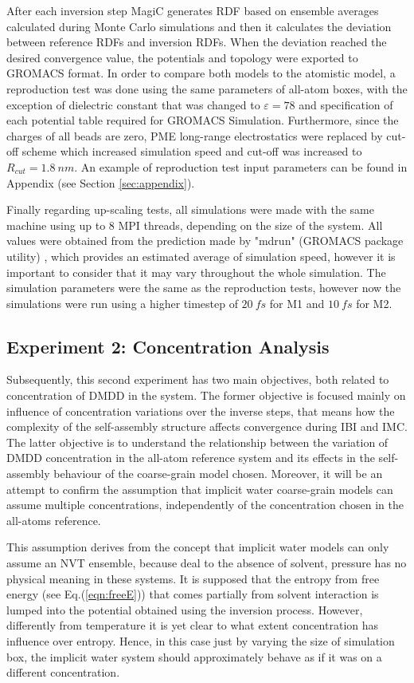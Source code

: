 \documentclass[10pt,a4paper,twoside]{article}
\begin{document}
 After each inversion step MagiC generates RDF based on ensemble averages calculated during Monte Carlo simulations and then it calculates the deviation between reference RDFs and inversion RDFs. When the deviation reached the desired convergence value, the potentials and topology were exported to GROMACS format. In order to compare both models to the atomistic model, a reproduction test was done using the same parameters of all-atom boxes, with the exception of dielectric constant that was changed to $\varepsilon = 78$ and specification of each potential table required for GROMACS Simulation. Furthermore, since the charges of all beads are zero, PME long-range electrostatics were replaced by cut-off scheme which increased simulation speed and cut-off was increased to $R_{cut} = 1.8 \ nm$. An example of reproduction test input parameters can be found in Appendix (see Section \ref{sec:appendix}).
 
 Finally regarding up-scaling tests, all simulations were made with the same machine using up to 8 MPI threads, depending on the size of the system. All values were obtained from the prediction made by "mdrun" (GROMACS package utility) \cite{gromanual}, which provides an estimated average of simulation speed, however it is important to consider that it may vary throughout the whole simulation. The simulation parameters were the same as the reproduction tests, however now the simulations were run using a higher timestep of $20\ fs$ for M1 and $10\ fs$ for M2. 

\subsection{Experiment 2: Concentration Analysis}
 Subsequently, this second experiment has two main objectives, both related to concentration of DMDD in the system. The former objective is focused mainly on influence of concentration variations over the inverse steps, that means how the complexity of the self-assembly 
 structure affects convergence during IBI and IMC. The latter objective is to understand the relationship between the variation of DMDD concentration in the all-atom reference system and its effects in the self-assembly behaviour of the coarse-grain model chosen. Moreover, it will be an attempt to confirm the assumption that implicit water coarse-grain models can assume multiple concentrations, independently of the concentration chosen in the all-atoms reference.
 
 This assumption derives from the concept that implicit water models can only assume an NVT ensemble, because deal to the absence of solvent, pressure has no physical meaning in these systems. It is supposed that the entropy from free energy (see Eq.(\ref{eqn:freeE})) that comes partially from solvent interaction is lumped into the potential obtained using the inversion process. However,   differently from temperature it is yet clear to what extent concentration has influence over entropy. Hence, in this case just by varying the size of simulation box, the implicit water system should approximately behave as if it was on a different concentration.
  
\end{document}
